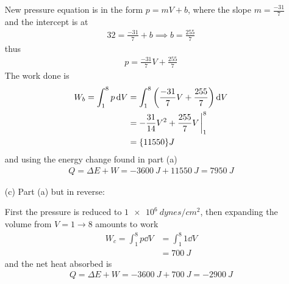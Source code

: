 \documentclass[../main.tex]{subfiles}
\begin{document}
\begin{itemize}
    New pressure equation is in the form $p = mV + b$, where the slope $m = \frac{-31}{7}$ and the intercept is at
    \begin{align*}
        32 = \frac{-31}{7} + b \implies b = \frac{255}{7}
    \end{align*}
    thus
    \begin{align*}
        p = \frac{-31}{7}V + \frac{255}{7}
    \end{align*}
    The work done is
    \begin{align*}
        W_b = \int_1^8 p \dd{V} &= \int_1^8 \qt(\frac{-31}{7}V + \frac{255}{7}) \dd{V} \\
        &= -\frac{31}{14} V^2 + \frac{255}{7} V \eval_1^8 \\
        &= \qty{11550}{J}
    \end{align*}
    and using the energy change found in part (a)
    \begin{align*}
        Q = \Delta E + W = \qty{-3600}{J} + \qty{11550}{J} = \qty{7950}{J}
    \end{align*}
    \item [(c)] Part (a) but in reverse: 
    
    First the pressure is reduced to $\qty{1e6}{dynes/cm^2}$, then expanding the volume from $V = 1 \to 8$ amounts to work
    \begin{align*}
        W_c = \int_1^8 p \dd{V} &= \int_1^8 1 \dd{V} \\
        &= \qty{700}{J}
    \end{align*}
    and the net heat absorbed is
    \begin{align*}
        Q = \Delta E + W = \qty{-3600}{J} + \qty{700}{J} = \qty{-2900}{J}
    \end{align*}
\end{itemize}

\newpage
\end{document}
